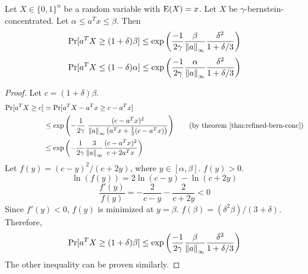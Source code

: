 \begin{theorem}
Let $X \in \{0, 1\}^n$ be a random variable with $\operatorname*{E}(X) = x$.
Let $X$ be $\gamma$-bernstein-concentrated.
Let $\alpha \le a^Tx \le \beta$. Then
\[ \Pr[ a^TX \ge (1+\delta)\beta ]
\le \exp\left(\frac{-1}{2\gamma} \frac{\beta}{\left\lVert a \right\rVert_{\infty}} \frac{\delta^2}{1+\delta/3} \right) \]
\[ \Pr[ a^TX \le (1-\delta)\alpha ]
\le \exp\left(\frac{-1}{2\gamma} \frac{\alpha}{\left\lVert a \right\rVert_{\infty}} \frac{\delta^2}{1+\delta/3} \right) \]
\end{theorem}
\begin{proof}
Let $c = (1+\delta)\beta$.
\begin{align*}
\Pr[ a^TX \ge c ]
&= \Pr[ a^TX - a^Tx \ge c - a^Tx ]
\\ &\le \exp\left( -\frac{1}{2\gamma} \; \frac{(c-a^Tx)^2}{\norm{a}_{\infty}
\left(a^Tx + \frac{1}{3}(c - a^Tx)\right)} \right)
\tag{by theorem \ref{thm:refined-bern-conc}}
\\ &\le \exp\left( -\frac{1}{2\gamma} \frac{3}{\norm{a}_{\infty}} \frac{(c-a^Tx)^2}{c + 2a^Tx} \right)
\end{align*}
Let $f(y) = (c-y)^2/(c+2y)$, where $y \in [\alpha, \beta]$. $f(y) > 0$.
\[ \ln(f(y)) = 2\ln(c-y) - \ln(c+2y) \]
\[ \frac{f'(y)}{f(y)} = -\frac{2}{c-y} - \frac{2}{c+2y} < 0 \]
Since $f'(y) < 0$, $f(y)$ is minimized at $y = \beta$.
$f(\beta) = (\delta^2\beta)/(3 + \delta)$.
Therefore,
\[ \Pr[ a^TX \ge (1+\delta)\beta ]
\le \exp\left( \frac{-1}{2\gamma} \frac{\beta}{\left\lVert a \right\rVert_{\infty}} \frac{\delta^2}{1+\delta/3} \right) \]
The other inequality can be proven similarly.
\end{proof}



